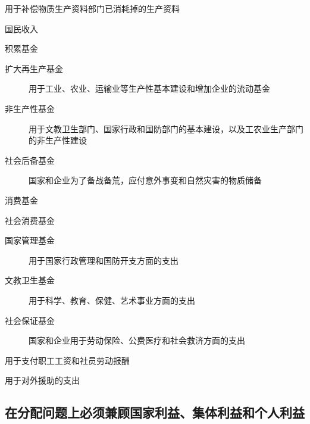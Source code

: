 \documentclass{book}
\begin{document}
    \begin{description}
\item [补偿基金]用于补偿物质生产资料部门已消耗掉的生产资料
\item 国民收入

    \begin{description}
\item 积累基金

    \begin{description}
    
\item [扩大再生产基金]用于工业、农业、运输业等生产性基本建设和增加企业的流动基金
\item [非生产性基金]用于文教卫生部门、国家行政和国防部门的基本建设，以及工农业生产部门的非生产性建设
\item [社会后备基金]国家和企业为了备战备荒，应付意外事变和自然灾害的物质储备


    
    \end{description}
\item 消费基金

    \begin{description}
   
\item 社会消费基金

    \begin{description}
    
\item [国家管理基金]用于国家行政管理和国防开支方面的支出
\item [文教卫生基金]用于科学、教育、保健、艺术事业方面的支出
\item [社会保证基金]国家和企业用于劳动保险、公费医疗和社会救济方面的支出
    
    \end{description}       
\item [个人消费基金]用于支付职工工资和社员劳动报酬
    \end{description}    

\item [援外基金]用于对外援助的支出

    \end{description}

    \end{description}

\subsection{在分配问题上必须兼顾国家利益、集体利益和个人利益}
\end{document}
